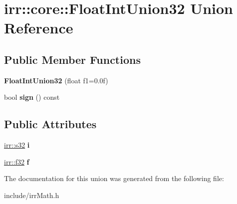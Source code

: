\hypertarget{unionirr_1_1core_1_1FloatIntUnion32}{}\section{irr\+:\+:core\+:\+:Float\+Int\+Union32 Union Reference}
\label{unionirr_1_1core_1_1FloatIntUnion32}
\subsection*{Public Member Functions}
\begin{DoxyCompactItemize}
\item 
{\bfseries Float\+Int\+Union32} (float f1=0.\+0f)\hypertarget{unionirr_1_1core_1_1FloatIntUnion32_a8bb52272b7efd87afba959ae50365d24}{}\label{unionirr_1_1core_1_1FloatIntUnion32_a8bb52272b7efd87afba959ae50365d24}

\item 
bool {\bfseries sign} () const \hypertarget{unionirr_1_1core_1_1FloatIntUnion32_a24af76290e16126c533f6b76391372b3}{}\label{unionirr_1_1core_1_1FloatIntUnion32_a24af76290e16126c533f6b76391372b3}

\end{DoxyCompactItemize}
\subsection*{Public Attributes}
\begin{DoxyCompactItemize}
\item 
\hyperlink{namespaceirr_ac66849b7a6ed16e30ebede579f9b47c6}{irr\+::s32} {\bfseries i}\hypertarget{unionirr_1_1core_1_1FloatIntUnion32_a79c3131fd06e80a7ca80b9c0201c60fb}{}\label{unionirr_1_1core_1_1FloatIntUnion32_a79c3131fd06e80a7ca80b9c0201c60fb}

\item 
\hyperlink{namespaceirr_a0277be98d67dc26ff93b1a6a1d086b07}{irr\+::f32} {\bfseries f}\hypertarget{unionirr_1_1core_1_1FloatIntUnion32_a6be8ea1e57c1fa1824799c470d08af98}{}\label{unionirr_1_1core_1_1FloatIntUnion32_a6be8ea1e57c1fa1824799c470d08af98}

\end{DoxyCompactItemize}


The documentation for this union was generated from the following file\+:\begin{DoxyCompactItemize}
\item 
include/irr\+Math.\+h\end{DoxyCompactItemize}
